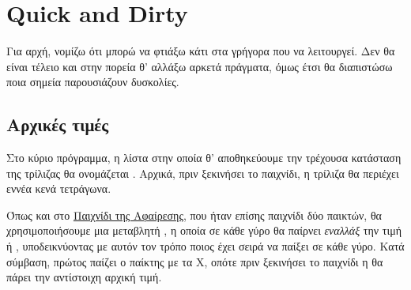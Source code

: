 \documentclass[a4paper,11pt,oneside]{book}
\begin{document}

\section{Quick and Dirty}

\begin{question}
Για αρχή, νομίζω ότι μπορώ να φτιάξω κάτι στα γρήγορα που να λειτουργεί. Δεν θα είναι τέλειο και στην πορεία θ' αλλάξω αρκετά πράγματα, όμως έτσι θα διαπιστώσω ποια σημεία παρουσιάζουν δυσκολίες.
\end{question}

\vspace{-12pt}
\subsection{Αρχικές τιμές}

Στο κύριο πρόγραμμα, η λίστα στην οποία θ' αποθηκεύουμε την τρέχουσα κατάσταση της τρίλιζας θα ονομάζεται . Αρχικά, πριν ξεκινήσει το παιχνίδι, η τρίλιζα θα περιέχει εννέα κενά τετράγωνα.


Όπως και στο \href{http://pythonies.mysch.gr/chapters/nim.pdf}{Παιχνίδι της Αφαίρεσης}, που ήταν επίσης παιχνίδι δύο παικτών, θα χρησιμοποιήσουμε μια μεταβλητή , η οποία σε κάθε γύρο θα παίρνει \emph{εναλλάξ} την τιμή  ή , υποδεικνύοντας με αυτόν τον τρόπο ποιος έχει σειρά να παίξει σε κάθε γύρο.
Κατά σύμβαση, πρώτος παίζει ο παίκτης με τα X, οπότε πριν ξεκινήσει το παιχνίδι η  θα πάρει την αντίστοιχη αρχική τιμή.

\clearpage
\end{document}
